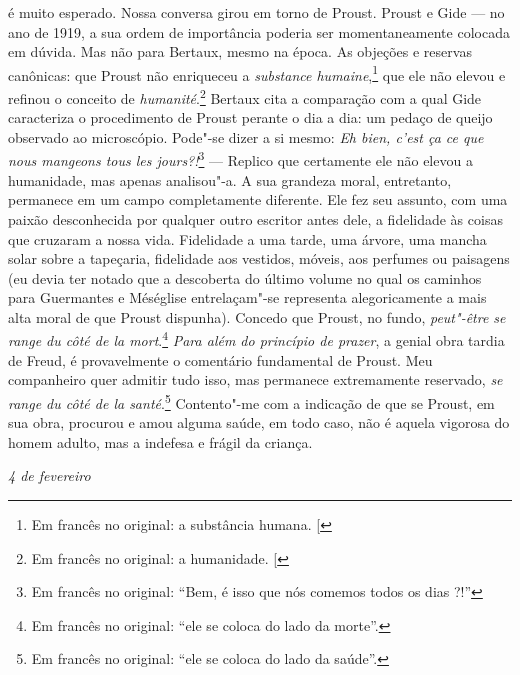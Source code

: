 é muito esperado. Nossa conversa girou em torno de Proust.
Proust e Gide --- no ano de 1919, a sua ordem de importância poderia ser
momentaneamente colocada em dúvida. Mas não para Bertaux, mesmo na
época. As objeções e reservas canônicas: que Proust não enriqueceu a
\emph{substance humaine},\footnote{Em francês no original: a substância humana. {[}\versal{N.~T.}{]}} que ele não elevou e refinou o conceito de
\emph{humanité}.\footnote{Em francês no original: a humanidade. {[}\versal{N.~T.}{]}} Bertaux cita a comparação com a qual Gide caracteriza o
procedimento de Proust perante o dia a dia: um pedaço de queijo
observado ao microscópio. Pode"-se dizer a si mesmo: \emph{Eh bien, c'est
ça ce que nous mangeons tous les jours?!}\footnote{Em francês no original: ``Bem, é isso
  que nós comemos todos os dias ?!'' \versal{[N.~T.]}} --- Replico
que certamente ele não elevou a humanidade, mas apenas analisou"-a. A sua
grandeza moral, entretanto, permanece em um campo completamente
diferente. Ele fez seu assunto, com uma paixão desconhecida por qualquer
outro escritor antes dele, a fidelidade às coisas que cruzaram a nossa
vida. Fidelidade a uma tarde, uma árvore, uma mancha solar sobre a
tapeçaria, fidelidade aos vestidos, móveis, aos perfumes ou paisagens
(eu devia ter notado que a descoberta do último volume no qual os caminhos
para Guermantes e Méséglise entrelaçam"-se representa alegoricamente a
mais alta moral de que Proust dispunha). Concedo que Proust, no fundo,
\emph{peut"-être se range du côté de la mort}.\footnote{Em francês no original: ``ele se
  coloca do lado da morte''. \versal{[N.~T.]}} \emph{Para além
do princípio de prazer}, a genial obra tardia de Freud, é provavelmente
o comentário fundamental de Proust. Meu companheiro quer admitir tudo
isso, mas permanece extremamente reservado, \emph{se range du côté de la
santé}.\footnote{Em francês no original: ``ele se coloca do lado da
  saúde''. \versal{[N.~T.]}} Contento"-me com a indicação de que
se Proust, em sua obra, procurou e amou alguma saúde, em todo caso,
não é aquela vigorosa do homem adulto, mas a indefesa e frágil da
criança.

\begin{flushright}
\emph{4 de fevereiro}
\end{flushright}

